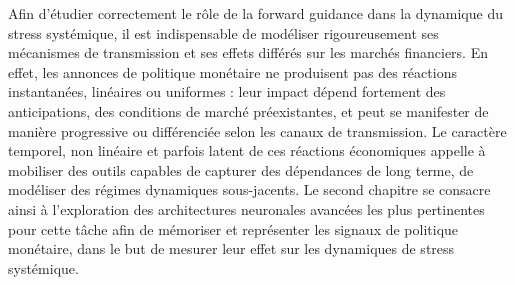 Afin d'étudier correctement le rôle de la forward guidance dans la dynamique du stress systémique, il est indispensable de modéliser rigoureusement ses mécanismes de transmission et ses effets différés sur les marchés financiers. En effet, les annonces de politique monétaire ne produisent pas des réactions instantanées, linéaires ou uniformes : leur impact dépend fortement des anticipations, des conditions de marché préexistantes, et peut se manifester de manière progressive ou différenciée selon les canaux de transmission. Le caractère temporel, non linéaire et parfois latent de ces réactions économiques appelle à mobiliser des outils capables de capturer des dépendances de long terme, de modéliser des régimes dynamiques sous-jacents. Le second chapitre se consacre ainsi à l’exploration des architectures neuronales avancées les plus pertinentes pour cette tâche afin de mémoriser et représenter les signaux de politique monétaire, dans le but de mesurer leur effet sur les dynamiques de stress systémique.